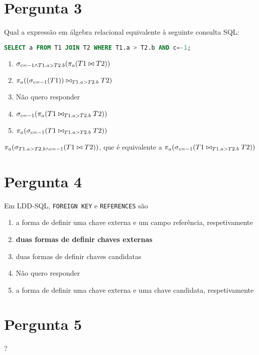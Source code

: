 {\section{Pergunta 3}
Qual a expressão em álgebra relacional equivalente à seguinte consulta SQL:
\begin{lstlisting}[language=SQL]
SELECT a FROM T1 JOIN T2 WHERE T1.a > T2.b AND c=-1;
\end{lstlisting}
\begin{enumerate}[label=\alph*.]\itemsep0em
    \item $\sigma_{c=-1 \wedge T1.a > T2.b}(\pi_{a}(T1 \bowtie T2))$
    \item $\pi_{a}((\sigma_{c=-1}(T1)) \bowtie_{T1.a > T2.b} T2)$
    \item Não quero responder
    \item $\sigma_{c=-1}(\pi_{a}(T1 \bowtie_{T1.a > T2.b} T2))$
    \item \textbf{$\pi_{a}(\sigma_{c=-1}(T1 \bowtie_{T1.a > T2.b} T2))$ \greencheckmark}
\end{enumerate}
$\pi_{a}(\sigma_{T1.a > T2.b \wedge c=-1}(T1 \bowtie T2))$, que é equivalente a $\pi_{a}(\sigma_{c=-1}(T1 \bowtie_{T1.a > T2.b} T2))$

\section{Pergunta 4}
Em LDD-SQL, \texttt{FOREIGN KEY} e \texttt{REFERENCES} são
\begin{enumerate}[label=\alph*.]\itemsep0em
    \item a forma de definir uma chave externa e um campo referência, respetivamente
    \item \textbf{duas formas de definir chaves externas \greencheckmark}
    \item duas formas de definir chaves candidatas
    \item Não quero responder
    \item a forma de definir uma chave externa e uma chave candidata, respetivamente
\end{enumerate}

\section{Pergunta 5}
?

}
